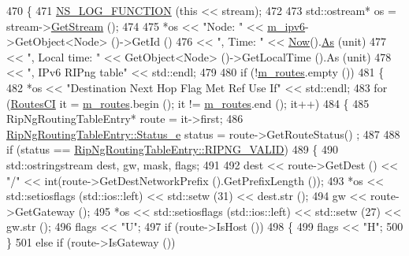 \begin{DoxyCode}
470 \{
471   \hyperlink{log-macros-disabled_8h_a90b90d5bad1f39cb1b64923ea94c0761}{NS\_LOG\_FUNCTION} (\textcolor{keyword}{this} << stream);
472 
473   std::ostream* os = stream->\hyperlink{classns3_1_1OutputStreamWrapper_a0cf30a4188ab6fdae2b2ab74db11acc2}{GetStream} ();
474 
475   *os << \textcolor{stringliteral}{"Node: "} << \hyperlink{classns3_1_1RipNg_aca7a023799ce2004499a826ba5d5d3fe}{m\_ipv6}->GetObject<Node> ()->GetId ()
476       << \textcolor{stringliteral}{", Time: "} << \hyperlink{group__simulator_gac3635e2e87f7ce316c89290ee1b01d0d}{Now}().\hyperlink{classns3_1_1Time_a0bb1110638ce9938248bd07865a328ab}{As} (unit)
477       << \textcolor{stringliteral}{", Local time: "} << GetObject<Node> ()->GetLocalTime ().As (unit)
478       << \textcolor{stringliteral}{", IPv6 RIPng table"} << std::endl;
479 
480   \textcolor{keywordflow}{if} (!\hyperlink{classns3_1_1RipNg_acfc1011b140f9e612a8c27c9bfb4c6b5}{m\_routes}.empty ())
481     \{
482       *os << \textcolor{stringliteral}{"Destination                    Next Hop                   Flag Met Ref Use If"} << std::endl;
483       \textcolor{keywordflow}{for} (\hyperlink{classns3_1_1RipNg_a139e1c11e66791c62fa5ccf632723f95}{RoutesCI} it = \hyperlink{classns3_1_1RipNg_acfc1011b140f9e612a8c27c9bfb4c6b5}{m\_routes}.begin (); it != \hyperlink{classns3_1_1RipNg_acfc1011b140f9e612a8c27c9bfb4c6b5}{m\_routes}.end (); it++)
484         \{
485           RipNgRoutingTableEntry* route = it->first;
486           \hyperlink{classns3_1_1RipNgRoutingTableEntry_af723fc23e97afdd05c55da5162b7e673}{RipNgRoutingTableEntry::Status\_e} status = route->GetRouteStatus()
      ;
487 
488           \textcolor{keywordflow}{if} (status == \hyperlink{classns3_1_1RipNgRoutingTableEntry_af723fc23e97afdd05c55da5162b7e673a334e33ca88fb2b8de53c814814d3c017}{RipNgRoutingTableEntry::RIPNG\_VALID})
489             \{
490               std::ostringstream dest, gw, mask, flags;
491 
492               dest << route->GetDest () << \textcolor{stringliteral}{"/"} << int(route->GetDestNetworkPrefix ().GetPrefixLength ());
493               *os << std::setiosflags (std::ios::left) << std::setw (31) << dest.str ();
494               gw << route->GetGateway ();
495               *os << std::setiosflags (std::ios::left) << std::setw (27) << gw.str ();
496               flags << \textcolor{stringliteral}{"U"};
497               \textcolor{keywordflow}{if} (route->IsHost ())
498                 \{
499                   flags << \textcolor{stringliteral}{"H"};
500                 \}
501               \textcolor{keywordflow}{else} \textcolor{keywordflow}{if} (route->IsGateway ())

\end{DoxyCode}
